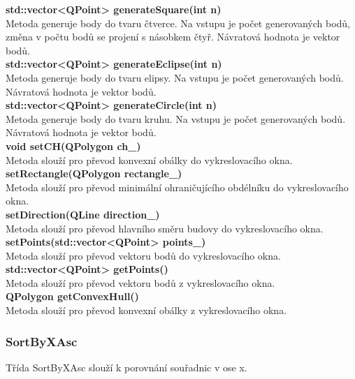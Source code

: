 \documentclass[a4paper, 12pt]{article}
\begin{document}
\textbf{std::vector<QPoint> generateSquare(int n)}\\
Metoda generuje body do tvaru čtverce. Na vstupu je počet generovaných bodů, změna v počtu bodů se projení s násobkem čtyř. Návratová hodnota je vektor bodů.\\

\textbf{std::vector<QPoint> generateEclipse(int n)}\\
Metoda generuje body do tvaru elipsy. Na vstupu je počet generovaných bodů. Návratová hodnota je vektor bodů.\\

\textbf{std::vector<QPoint> generateCircle(int n)}\\
Metoda generuje body do tvaru kruhu. Na vstupu je počet generovaných bodů. Návratová hodnota je vektor bodů.\\

\textbf{void setCH(QPolygon ch_)}\\
Metoda slouží pro převod konvexní obálky do vykreslovacího okna.\\

\textbf{setRectangle(QPolygon rectangle_)}\\
Metoda slouží pro převod minimální ohraničujícího obdélníku do vykreslovacího okna.\\

\textbf{setDirection(QLine direction_)}\\
Metoda slouží pro převod hlavního směru budovy do vykreslovacího okna.\\

\textbf{setPoints(std::vector<QPoint> points_)}\\
Metoda slouží pro převod vektoru bodů do vykreslovacího okna.\\

\textbf{std::vector<QPoint> getPoints()}\\
Metoda slouží pro převod vektoru bodů z vykreslovacího okna.\\

\textbf{QPolygon getConvexHull()}\\
Metoda slouží pro převod konvexní obálky z vykreslovacího okna.\\

\subsubsection{SortByXAsc}
Třída SortByXAsc slouží k porovnání souřadnic v ose x.
\\
\end{document}
